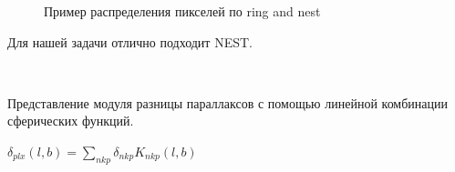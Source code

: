 \documentclass[14pt]{article} %
\begin{document}
\begin{figure}[h]
\begin{minipage}[h]{0.48\linewidth}
\end{minipage}
\hfill
\begin{minipage}[h]{0.48\linewidth}
\end{minipage}
\caption{Пример распределения  пикселей по ring and nest}
\label{ris:moll_nside32_healpix}
\end{figure}

Для нашей задачи отлично подходит NEST.

~\cite{wiki:healpix} 


Представление модуля разницы параллаксов с помощью линейной комбинации сферических функций.

$\delta_{plx}(l,b) = \sum_{nkp}\delta_{nkp}K_{nkp}(l,b)$
\end{document}
